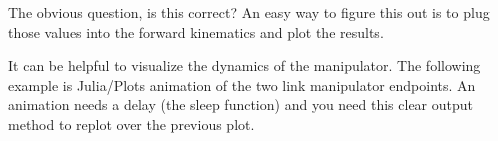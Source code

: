 The obvious question, is this correct? An easy way to figure this out is
to plug those values into the forward kinematics and plot the results.

\begin{Shaded}
\begin{Highlighting}[]
\OperatorTok{=}\OperatorTok{+}\OperatorTok{+}\NormalTok{)}
\OperatorTok{=}\OperatorTok{+}\OperatorTok{+}\NormalTok{)}
\OperatorTok{,}\OperatorTok{,}\OperatorTok{=} \OperatorTok{,}\OperatorTok{=} \OperatorTok{:}\OperatorTok{,}\OperatorTok{=}\NormalTok{)}
\end{Highlighting}
\end{Shaded}

It can be helpful to visualize the dynamics of the manipulator. The
following example is Julia/Plots animation of the two link manipulator
endpoints. An animation needs a delay (the sleep function) and you need
this clear output method to replot over the previous plot.

\begin{Shaded}
\begin{Highlighting}[]
\OperatorTok{=} \OperatorTok{:}
\NormalTok{)}
\OperatorTok{=}\OperatorTok{,}\NormalTok{[y[i]]}\OperatorTok{,}\OperatorTok{=}\NormalTok{ (}\OperatorTok{,}\NormalTok{)}\OperatorTok{,}\OperatorTok{=}\NormalTok{ (}\OperatorTok{,}\NormalTok{)}\OperatorTok{,}\OperatorTok{=} \OperatorTok{:}\OperatorTok{,}\OperatorTok{=} \OperatorTok{,}\OperatorTok{=} \OperatorTok{:}
\NormalTok{)}
\end{Highlighting}
\end{Shaded}

